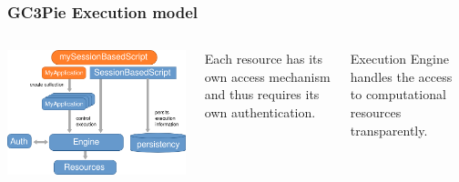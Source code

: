 \documentclass[english,serif,mathserif,xcolor=pdftex,dvipsnames,table]{beamer}
\begin{document}
\begin{frame}
  \frametitle{GC3Pie Execution model}
  \begin{columns}
      \includegraphics[width=1\textwidth]{fig/GC3Pie_execution_model}
  \begin{block}{}
    Each {\color{Blue}resource} has its own access mechanism and thus
    requires its own authentication.
  \end{block}

  \begin{block}{}
    Execution Engine handles the access to computational
    {\color{Blue}resources} transparently.
  \end{block}
  \end{columns}
\end{frame}
\end{document}
